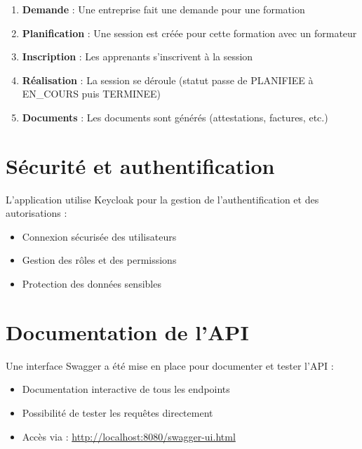 \documentclass[a4paper,12pt]{article}
\begin{document}
\begin{enumerate}
    \item \textbf{Demande} : Une entreprise fait une demande pour une formation
    \item \textbf{Planification} : Une session est créée pour cette formation avec un formateur
    \item \textbf{Inscription} : Les apprenants s'inscrivent à la session
    \item \textbf{Réalisation} : La session se déroule (statut passe de PLANIFIEE à EN\_COURS puis TERMINEE)
    \item \textbf{Documents} : Les documents sont générés (attestations, factures, etc.)
\end{enumerate}

\section{Sécurité et authentification}

L'application utilise Keycloak pour la gestion de l'authentification et des autorisations :
\begin{itemize}
    \item Connexion sécurisée des utilisateurs
    \item Gestion des rôles et des permissions
    \item Protection des données sensibles
\end{itemize}

\begin{center}
\end{center}

\section{Documentation de l'API}

Une interface Swagger a été mise en place pour documenter et tester l'API :
\begin{itemize}
    \item Documentation interactive de tous les endpoints
    \item Possibilité de tester les requêtes directement
    \item Accès via : \url{http://localhost:8080/swagger-ui.html}
\end{itemize}
\end{document}
